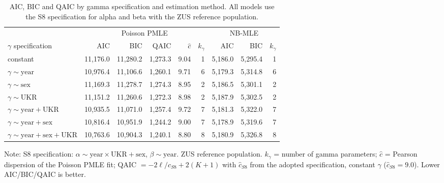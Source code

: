 \begin{table}[ht!]
\caption{\label{tbl-cov-gamma-aic}AIC, BIC and QAIC by gamma specification and estimation method. All models use the S8 specification for alpha and beta with the ZUS reference population.} 
\fontsize{8.0pt}{10.0pt}\selectfont
\begin{tabular*}{\linewidth}{@{\extracolsep{\fill}}lrrrrrrrr}
\toprule
 & \multicolumn{5}{c}{{Poisson PMLE}} & \multicolumn{3}{c}{{NB-MLE}} \\ 
\cmidrule(lr){2-6} \cmidrule(lr){7-9}
$\gamma$ specification & AIC & BIC & QAIC & $\hat c$ & $k_\gamma$ & AIC & BIC & $k_\gamma$ \\ 
\midrule\addlinespace[2.5pt]
constant & 11,176.0 & 11,280.2 & 1,273.3 & 9.04 & 1 & 5,186.0 & 5,295.4 & 1 \\ 
$\gamma \sim \text{year}$ & 10,976.4 & 11,106.6 & 1,260.1 & 9.71 & 6 & 5,179.3 & 5,314.8 & 6 \\ 
$\gamma \sim \text{sex}$ & 11,169.3 & 11,278.7 & 1,274.3 & 8.95 & 2 & 5,186.5 & 5,301.1 & 2 \\ 
$\gamma \sim \text{UKR}$ & 11,151.2 & 11,260.6 & 1,272.3 & 8.98 & 2 & 5,187.9 & 5,302.5 & 2 \\ 
$\gamma \sim \text{year} + \text{UKR}$ & 10,935.5 & 11,071.0 & 1,257.4 & 9.72 & 7 & 5,181.3 & 5,322.0 & 7 \\ 
$\gamma \sim \text{year} + \text{sex}$ & 10,816.4 & 10,951.9 & 1,244.2 & 9.00 & 7 & 5,178.9 & 5,319.6 & 7 \\ 
$\gamma \sim \text{year} + \text{sex} + \text{UKR}$ & 10,763.6 & 10,904.3 & 1,240.1 & 8.80 & 8 & 5,180.9 & 5,326.8 & 8 \\ 
\bottomrule
\end{tabular*}
\begin{minipage}{\linewidth}
\vspace{.05em}
Note: S8 specification: $\alpha \sim \text{year} \times \text{UKR} + \text{sex}$, $\beta \sim \text{year}$. ZUS reference population. $k_\gamma$ = number of gamma parameters; $\hat c$ = Pearson dispersion of the Poisson PMLE fit; QAIC $= -2\ell/\hat c_{S8} + 2(K+1)$ with $\hat c_{S8}$ from the adopted specification, constant $\gamma$ ($\hat c_{S8} = 9.0$). Lower AIC/BIC/QAIC is better.\\
\end{minipage}
\end{table}

